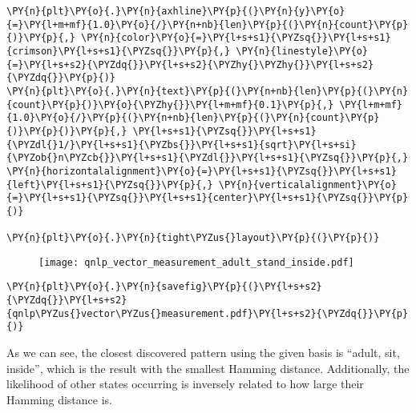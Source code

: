\begin{tcolorbox}[breakable, size=fbox, boxrule=1pt, pad at break*=1mm,colback=cellbackground, colframe=cellborder]
\begin{Verbatim}[commandchars=\\\{\}]
\PY{n}{plt}\PY{o}{.}\PY{n}{axhline}\PY{p}{(}\PY{n}{y}\PY{o}{=}\PY{l+m+mf}{1.0}\PY{o}{/}\PY{n+nb}{len}\PY{p}{(}\PY{n}{count}\PY{p}{)}\PY{p}{,} \PY{n}{color}\PY{o}{=}\PY{l+s+s1}{\PYZsq{}}\PY{l+s+s1}{crimson}\PY{l+s+s1}{\PYZsq{}}\PY{p}{,} \PY{n}{linestyle}\PY{o}{=}\PY{l+s+s2}{\PYZdq{}}\PY{l+s+s2}{\PYZhy{}\PYZhy{}}\PY{l+s+s2}{\PYZdq{}}\PY{p}{)}
\PY{n}{plt}\PY{o}{.}\PY{n}{text}\PY{p}{(}\PY{n+nb}{len}\PY{p}{(}\PY{n}{count}\PY{p}{)}\PY{o}{\PYZhy{}}\PY{l+m+mf}{0.1}\PY{p}{,} \PY{l+m+mf}{1.0}\PY{o}{/}\PY{p}{(}\PY{n+nb}{len}\PY{p}{(}\PY{n}{count}\PY{p}{)}\PY{p}{)}\PY{p}{,} \PY{l+s+s1}{\PYZsq{}}\PY{l+s+s1}{\PYZdl{}1/}\PY{l+s+s1}{\PYZbs{}}\PY{l+s+s1}{sqrt}\PY{l+s+si}{\PYZob{}n\PYZcb{}}\PY{l+s+s1}{\PYZdl{}}\PY{l+s+s1}{\PYZsq{}}\PY{p}{,} \PY{n}{horizontalalignment}\PY{o}{=}\PY{l+s+s1}{\PYZsq{}}\PY{l+s+s1}{left}\PY{l+s+s1}{\PYZsq{}}\PY{p}{,} \PY{n}{verticalalignment}\PY{o}{=}\PY{l+s+s1}{\PYZsq{}}\PY{l+s+s1}{center}\PY{l+s+s1}{\PYZsq{}}\PY{p}{)}

\PY{n}{plt}\PY{o}{.}\PY{n}{tight\PYZus{}layout}\PY{p}{(}\PY{p}{)}
\end{Verbatim}
\end{tcolorbox}

   \begin{figure}
   \centering
   \texttt{[image: qnlp\_vector\_measurement\_adult\_stand\_inside.pdf]}
   \end{figure}
    
    \begin{tcolorbox}[breakable, size=fbox, boxrule=1pt, pad at break*=1mm,colback=cellbackground, colframe=cellborder]
\begin{Verbatim}[commandchars=\\\{\}]
\PY{n}{plt}\PY{o}{.}\PY{n}{savefig}\PY{p}{(}\PY{l+s+s2}{\PYZdq{}}\PY{l+s+s2}{qnlp\PYZus{}vector\PYZus{}measurement.pdf}\PY{l+s+s2}{\PYZdq{}}\PY{p}{)}
\end{Verbatim}
\end{tcolorbox}

    As we can see, the closest discovered pattern using the given basis is
``adult, sit, inside'', which is the result with the smallest Hamming
distance. Additionally, the likelihood of other states occurring is inversely
related to how large their Hamming distance is.
\clearpage